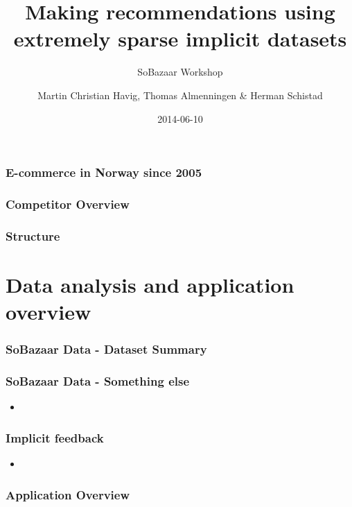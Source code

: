\documentclass{beamer}
\title{Making recommendations using extremely sparse
       implicit datasets}
\subtitle{SoBazaar Workshop}
\date{2014-06-10}
\author{Martin Christian Havig, Thomas Almenningen \& Herman Schistad}
\begin{document}
  \begin{frame}
    \titlepage
  \end{frame}

  \begin{frame}
    \frametitle{E-commerce in Norway since 2005}
  \end{frame}

  \begin{frame}
    \frametitle{Competitor Overview}
  \end{frame}

  \begin{frame}
    \frametitle{Structure}
    \tableofcontents
  \end{frame}

  \section{Data analysis and application overview}

  \begin{frame}
    \frametitle{SoBazaar Data - Dataset Summary}
  \end{frame}

  \begin{frame}
    \frametitle{SoBazaar Data - Something else}
    \begin{itemize}
      \item
    \end{itemize}
  \end{frame}

  \begin{frame}
    \frametitle{Implicit feedback}
    \begin{itemize}
      \item
    \end{itemize}
  \end{frame}

  \begin{frame}
    \frametitle{Application Overview}
  \end{frame}

\end{document}
